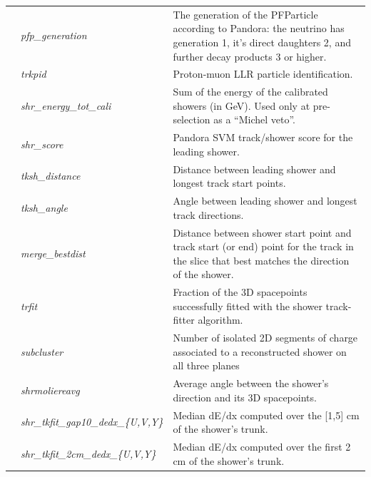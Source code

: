 \begin{table}[ht]
\begin{tabular}{ m{} | m{} | m{}  }
\hline
\multicolumn{1}{l|}{} & \emph{pfp\_generation} & The generation of the PFParticle according to Pandora: the neutrino has generation 1, it's direct daughters 2, and further decay products 3 or higher.\\  \cline{2-3}
\multicolumn{1}{l|}{} & \emph{trkpid}  &  Proton-muon LLR particle identification. \\  \cline{2-3}
\parbox[t]{2mm}{}  & \emph{shr\_energy\_tot\_cali}  & Sum  of  the  energy  of  the  calibrated  showers  (in  GeV). Used  only  at pre-selection as a ``Michel veto”.\\  
 & \emph{shr\_score} & Pandora  SVM track/shower score for the leading shower.\\  
  & \emph{tksh\_distance}  & Distance between leading shower and longest track start points.\\  
 & \emph{tksh\_angle}  & Angle  between  leading  shower   and  longest  track directions.\\  
 & \emph{merge\_bestdist}  & Distance between shower start point and track start (or end) point for the track in the slice that best matches the direction of the shower.\\  
 & \emph{trfit} & Fraction of the 3D spacepoints successfully fitted with the shower track-fitter algorithm. \\  
 & \emph{subcluster} & Number of isolated 2D segments of charge associated to a reconstructed shower on all three planes  \\  
 & \emph{shrmoliereavg} &  Average angle between the shower’s direction and its 3D spacepoints.    \\ 
 & \emph{shr\_tkfit\_gap10\_dedx\_\{U,V,Y\}}  & Median dE/dx computed over the [1,5] cm of the shower’s  trunk. \\ 
 & \emph{shr\_tkfit\_2cm\_dedx\_\{U,V,Y\}}  & Median dE/dx computed  over  the first 2 cm of the shower’s  trunk. \\ 
\hline


\end{tabular}
\end{table}
